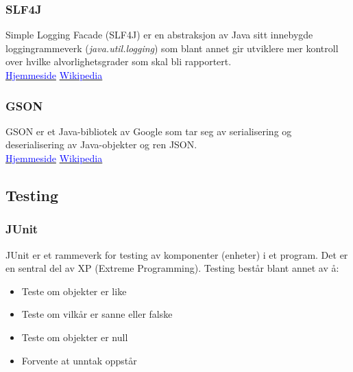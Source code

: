 \documentclass[12pt]{report}
\begin{document}
\subsubsection*{SLF4J}

Simple Logging Facade (SLF4J) er en abstraksjon av Java sitt innebygde loggingrammeverk (\textit{java.util.logging}) som
blant annet gir utviklere mer kontroll over hvilke alvorlighetsgrader som skal bli rapportert. \\

\href{https://www.slf4j.org/}{\textcolor{blue}{Hjemmeside}} {\textperiodcentered}
\href{https://en.wikipedia.org/wiki/SLF4J}{\textcolor{blue}{Wikipedia}}

\subsubsection*{GSON}

GSON er et Java-bibliotek av Google som tar seg av serialisering og deserialisering av Java-objekter og ren JSON. \\

\href{https://github.com/google/gson}{\textcolor{blue}{Hjemmeside}} {\textperiodcentered}
\href{https://en.wikipedia.org/wiki/Gson}{\textcolor{blue}{Wikipedia}}

\subsection*{Testing}

\subsubsection*{JUnit}

JUnit er et rammeverk for testing av komponenter (enheter) i et program. Det er en sentral del av XP (Extreme
Programming). Testing best{\aa}r blant annet av {\aa}:

\begin{itemize}
\item Teste om objekter er like
\item Teste om vilk{\aa}r er sanne eller falske
\item Teste om objekter er null
\item Forvente at unntak oppst{\aa}r
\end{itemize}
\end{document}
